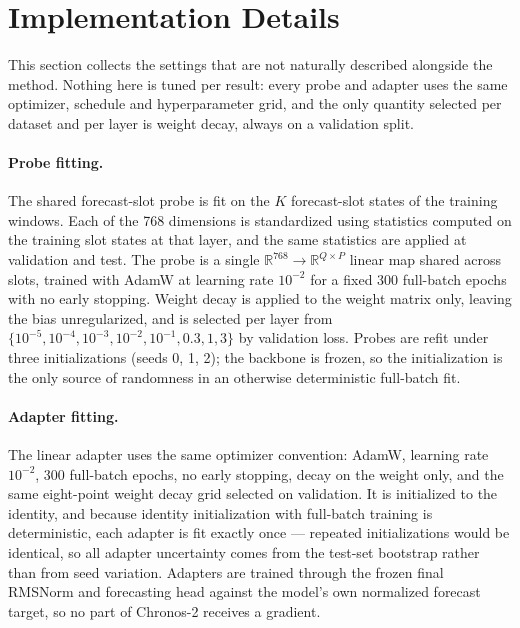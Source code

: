 \section{Implementation Details}
\label{app:implementation}

This section collects the settings that are not naturally described alongside the method. Nothing
here is tuned per result: every probe and adapter uses the same optimizer, schedule and
hyperparameter grid, and the only quantity selected per dataset and per layer is weight decay,
always on a validation split.

\paragraph{Probe fitting.}
The shared forecast-slot probe is fit on the \(K\) forecast-slot states of the training windows.
Each of the 768 dimensions is standardized using statistics computed on the training slot states at
that layer, and the same statistics are applied at validation and test. The probe is a single
\(\mathbb{R}^{768} \rightarrow \mathbb{R}^{Q \times P}\) linear map shared across slots, trained
with AdamW at learning rate \(10^{-2}\) for a fixed 300 full-batch epochs with no early stopping.
Weight decay is applied to the weight matrix only, leaving the bias unregularized, and is selected
per layer from \(\{10^{-5}, 10^{-4}, 10^{-3}, 10^{-2}, 10^{-1}, 0.3, 1, 3\}\) by validation loss.
Probes are refit under three initializations (seeds 0, 1, 2); the backbone is frozen, so the
initialization is the only source of randomness in an otherwise deterministic full-batch fit.

\paragraph{Adapter fitting.}
The linear adapter uses the same optimizer convention: AdamW, learning rate \(10^{-2}\), 300
full-batch epochs, no early stopping, decay on the weight only, and the same eight-point weight
decay grid selected on validation. It is initialized to the identity, and because identity
initialization with full-batch training is deterministic, each adapter is fit exactly once ---
repeated initializations would be identical, so all adapter uncertainty comes from the test-set
bootstrap rather than from seed variation. Adapters are trained through the frozen final RMSNorm
and forecasting head against the model's own normalized forecast target, so no part of Chronos-2
receives a gradient.

